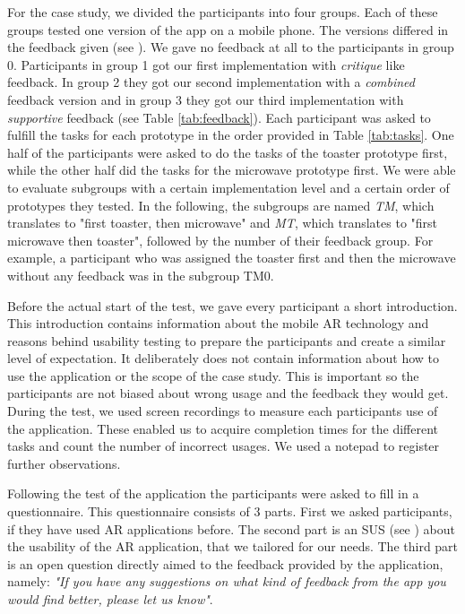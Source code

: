 \documentclass[11pt, a4paper]{article}
\begin{document}
			For the case study, we divided the participants into four groups. Each of these groups tested one version of the app on a mobile phone. The versions differed in the feedback given (see ). We gave no feedback at all to the participants in group 0. Participants in group 1 got our first implementation with \emph{critique} like feedback. In group 2 they got our second implementation with a \emph{combined} feedback version and in group 3 they got our third implementation with \emph{supportive} feedback (see Table \ref{tab:feedback}). Each participant was asked to fulfill the tasks for each prototype in the order provided in Table \ref{tab:tasks}. One half of the participants were asked to do the tasks of the toaster prototype first, while the other half did the tasks for the microwave prototype first. We were able to evaluate subgroups with a certain implementation level and a certain order of prototypes they tested. In the following, the subgroups are named \emph{TM}, which translates to "first toaster, then microwave" and \emph{MT}, which translates to "first microwave then toaster", followed by the number of their feedback group. For example, a participant who was assigned the toaster first and then the microwave without any feedback was in the subgroup TM0.

			Before the actual start of the test, we gave every participant a short introduction. This introduction contains information about the mobile \ac{AR} technology and reasons behind usability testing to prepare the participants and create a similar level of expectation. It deliberately does not contain information about how to use the application or the scope of the case study. This is important so the participants are not biased about wrong usage and the feedback they would get. During the test, we used screen recordings to measure each participants use of the application. These enabled us to acquire completion times for the different tasks and count the number of incorrect usages. We used a notepad to register further observations.

			Following the test of the application the participants were asked to fill in a questionnaire. This questionnaire consists of 3 parts. First we asked participants, if they have used \ac{AR} applications before. The second part is an \ac{SUS} (see ) about the usability of the \ac{AR} application, that we tailored for our needs. The third part is an open question directly aimed to the feedback provided by the application, namely: \emph{"If you have any suggestions on what kind of feedback from the app you would find better, please let us know"}.
\end{document}
